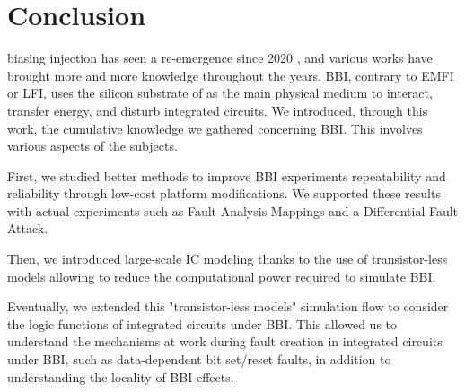 
\section{Conclusion}
	 biasing injection has seen a re-emergence since 2020 \cite{bbiColin}, and various works have brought more and more knowledge throughout the years.
	BBI, contrary to EMFI or LFI, uses the silicon substrate of as the main physical medium to interact, transfer energy, and disturb integrated circuits.
	We introduced, through this work, the cumulative knowledge we gathered concerning BBI.
	This involves various aspects of the subjects.

	First, we studied better methods to improve BBI experiments repeatability and reliability through low-cost platform modifications.
	We supported these results with actual experiments such as Fault Analysis Mappings and a Differential Fault Attack.

	Then, we introduced large-scale IC modeling thanks to the use of transistor-less models allowing to reduce the computational power required to simulate BBI.

	Eventually, we extended this "transistor-less models" simulation flow to consider the logic functions of integrated circuits under BBI.
	This allowed us to understand the mechanisms at work during fault creation in integrated circuits under BBI, such as data-dependent bit set/reset faults, in addition to understanding the locality of BBI effects.